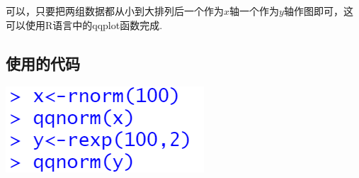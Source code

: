 \documentclass{article}
\begin{document}
\begin{CJK}{UTF8}{gbsn}
\subsection{}
可以，只要把两组数据都从小到大排列后一个作为$x$轴一个作为$y$轴作图即可，这可以使用R语言中的qqplot函数完成.
\subsection{使用的代码}
\begin{minipage}{0.5\textwidth}
    \includegraphics[scale=0.6]{code.png}
\end{minipage}
\end{CJK}
\end{document}
